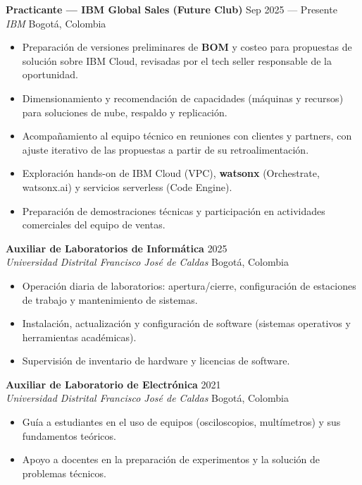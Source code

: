 \documentclass[11pt,a4paper]{article}
\newcommand{\cventry}[4]{%
  \textbf{\color{darktext}#1} \hfill {\small\color{graytext}#2} \\
  {\color{accent}\textit{#3}} \hfill {\small\color{graytext}#4}
  \vspace{4pt}
}
\begin{document}
\cventry{Practicante --- IBM Global Sales (Future Club)}{Sep 2025 --- Presente}{IBM}{Bogot\'a, Colombia}
\begin{itemize}[leftmargin=14pt, itemsep=1pt, topsep=0pt]
  \item Preparaci\'on de versiones preliminares de \textbf{BOM} y costeo para propuestas de soluci\'on sobre IBM Cloud, revisadas por el tech seller responsable de la oportunidad.
  \item Dimensionamiento y recomendaci\'on de capacidades (m\'aquinas y recursos) para soluciones de nube, respaldo y replicaci\'on.
  \item Acompa\~namiento al equipo t\'ecnico en reuniones con clientes y partners, con ajuste iterativo de las propuestas a partir de su retroalimentaci\'on.
  \item Exploraci\'on hands-on de IBM Cloud (VPC), \textbf{watsonx} (Orchestrate, watsonx.ai) y servicios serverless (Code Engine).
  \item Preparaci\'on de demostraciones t\'ecnicas y participaci\'on en actividades comerciales del equipo de ventas.
\end{itemize}
\vspace{5pt}

\cventry{Auxiliar de Laboratorios de Inform\'atica}{2025}{Universidad Distrital Francisco Jos\'e de Caldas}{Bogot\'a, Colombia}
\begin{itemize}[leftmargin=14pt, itemsep=1pt, topsep=0pt]
  \item Operaci\'on diaria de laboratorios: apertura/cierre, configuraci\'on de estaciones de trabajo y mantenimiento de sistemas.
  \item Instalaci\'on, actualizaci\'on y configuraci\'on de software (sistemas operativos y herramientas acad\'emicas).
  \item Supervisi\'on de inventario de hardware y licencias de software.
\end{itemize}
\vspace{5pt}

\cventry{Auxiliar de Laboratorio de Electr\'onica}{2021}{Universidad Distrital Francisco Jos\'e de Caldas}{Bogot\'a, Colombia}
\begin{itemize}[leftmargin=14pt, itemsep=1pt, topsep=0pt]
  \item Gu\'ia a estudiantes en el uso de equipos (osciloscopios, mult\'imetros) y sus fundamentos te\'oricos.
  \item Apoyo a docentes en la preparaci\'on de experimentos y la soluci\'on de problemas t\'ecnicos.
\end{itemize}
\end{document}
